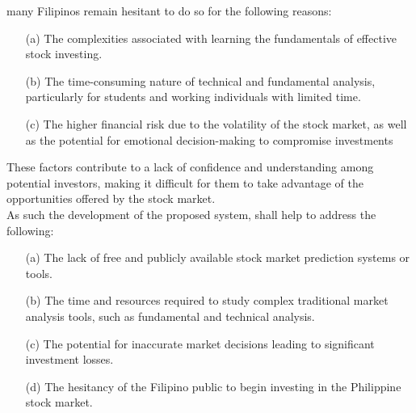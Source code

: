 many Filipinos remain hesitant to do so for the following reasons:
\begin{itemize}
  \item[(a)] The complexities associated with learning the fundamentals 
  of effective stock investing.
  \item[(b)] The time-consuming nature of technical and fundamental 
  analysis, particularly for students and working individuals with limited time.
  \item[(c)] The higher financial risk due to the volatility of the stock market, 
  as well as the potential for emotional decision-making to compromise investments
\end{itemize}
These factors contribute to a lack of confidence and understanding 
among potential investors, making it difficult for them to take advantage of the 
opportunities offered by the stock market.
\\As such the development of the proposed system, shall help to address the following:
\begin{itemize}
  \item[(a)] The lack of free and publicly available 
  stock market prediction systems or tools.
  \item[(b)] The time and resources required to study complex traditional 
  market analysis tools, such as fundamental and technical analysis.
  \item[(c)] The potential for inaccurate market decisions
  leading to significant investment losses.
  \item[(d)] The hesitancy of the Filipino public to begin 
  investing in the Philippine stock market.
\end{itemize}